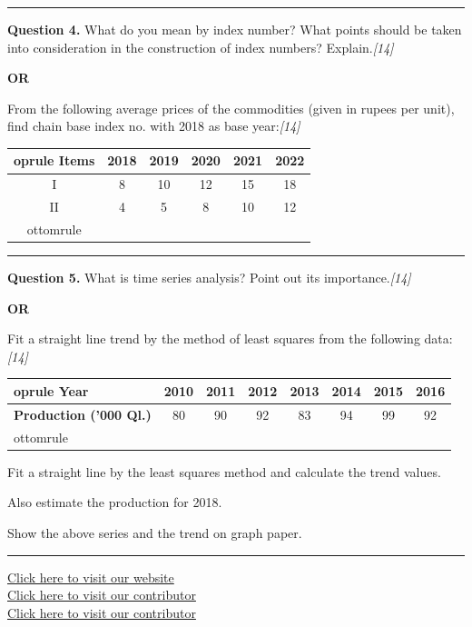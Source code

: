 \documentclass[11pt,a4paper]{article}
\newcommand{\pts}[1]{\hfill   \textit{[#1]}}
\begin{document}
\medskip\rule{\linewidth}{0.2pt}




\noindent   \textbf{Question 4.}
What do you mean by index number? What points should be taken into consideration in the construction of index numbers? Explain.\pts{14}

\centerline{   \textbf{OR}}

From the following average prices of the commodities (given in rupees per unit), find chain base index no. with 2018 as base year:\pts{14}

\begin{center}
  \small
  
\begin{tabular}{cccccc}
     oprule
   \textbf{Items} &   \textbf{2018} &   \textbf{2019} &   \textbf{2020} &   \textbf{2021} &   \textbf{2022} \\
    \midrule
    I              & 8             & 10            & 12            & 15            & 18            \\
    II             & 4             & 5             & 8             & 10            & 12            \\
    ottomrule
  \end{tabular}
\end{center}

\medskip\rule{\linewidth}{0.2pt}




\noindent   \textbf{Question 5.}
What is time series analysis? Point out its importance.\pts{14}

\centerline{   \textbf{OR}}

Fit a straight line trend by the method of least squares from the following data:\pts{14}

\begin{center}
  \small
  
\begin{tabular}{lccccccc}
     oprule
   \textbf{Year}                  & 2010 & 2011 & 2012 & 2013 & 2014 & 2015 & 2016 \\
    \midrule
   \textbf{Production ('000 Ql.)} & 80   & 90   & 92   & 83   & 94   & 99   & 92   \\
    ottomrule
  \end{tabular}
\end{center}

\begin{parts}
  \item Fit a straight line by the least squares method and calculate the trend values.
  \item Also estimate the production for 2018.
  \item Show the above series and the trend on graph paper.
\end{parts}

\vfill
\rule{\linewidth}{0.4pt}

\begin{center}\small
\href{https://bhu-exam.vercel.app/}{Click here to visit our website}\\[4pt]
\href{https://me-aryan.vercel.app/}{Click here to visit our contributor}\\[4pt]
\href{https://quashan-me.vercel.app/}{Click here to visit our contributor}
\end{center}
\end{document}
